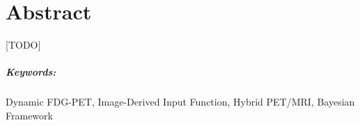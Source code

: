 \chapter*{Abstract}

[TODO] 

\paragraph{Keywords:} Dynamic FDG-PET, Image-Derived Input Function, Hybrid PET/MRI, Bayesian Framework

